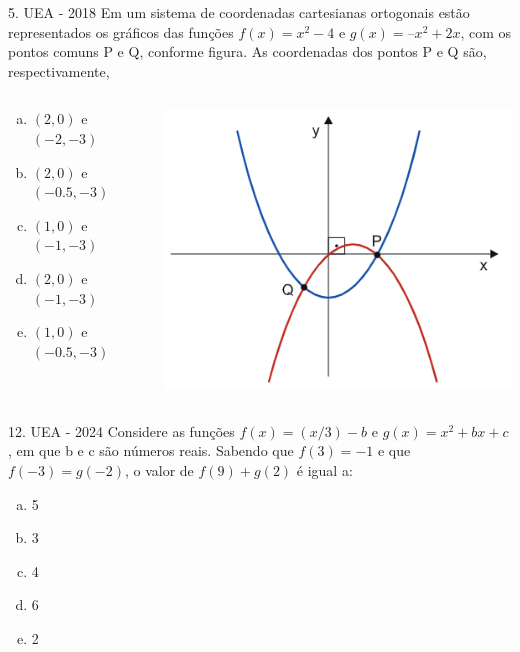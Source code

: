 \documentclass[11pt]{beamer}
\begin{document}
\begin{frame}{5. UEA - 2018}
    Em um sistema de coordenadas cartesianas ortogonais estão representados os gráficos das funções $f(x) = x^{2}-4$ e $g(x) = –x^{2}+2x$, com os pontos comuns P e Q, conforme figura. As coordenadas dos pontos P e Q são, respectivamente,

    \begin{columns}
        \begin{column}{0.4\textwidth}
            \begin{enumerate}[a)]
                \item $(2,0)$ e $(-2,-3)$  
                \item $(2,0)$ e $(-0.5,-3)$
                \item $(1,0)$ e $(-1,-3)$ 
                \item $(2,0)$ e $(-1,-3)$ %
                \item $(1,0)$ e $(-0.5,-3)$
            \end{enumerate}
        \end{column}

        \begin{column}{0.5\textwidth}
            \centering
            \includegraphics[width=0.8\linewidth]{imagens/uea-macro-2018.png}
        \end{column}
    \end{columns}
    
\end{frame}

\begin{frame}{12. UEA - 2024}
    Considere as funções $f(x)=({x}/{3})-b$ e $g(x)=x^{2}+bx+c$, em que b e c são números reais. Sabendo que $f(3)=-1$ e que $f(-3)=g(-2)$, o valor de $f(9)+g(2)$ é igual a:

    \begin{enumerate}[a)]
        \item 5
        \item 3
        \item 4
        \item 6 %
        \item 2
    \end{enumerate}
\end{frame}
\end{document}

